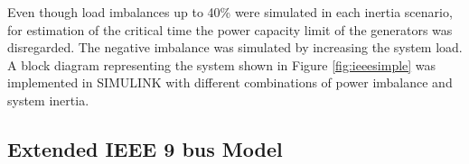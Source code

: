 Even though load imbalances up to 40\% were simulated in each inertia scenario, for estimation of the critical time the power capacity limit of the generators was disregarded. The negative imbalance was simulated by increasing the system load. A block diagram representing the system shown in Figure \ref{fig:ieeesimple} was implemented in SIMULINK with different combinations of power imbalance and system inertia. %

\subsection{Extended IEEE 9 bus Model}


